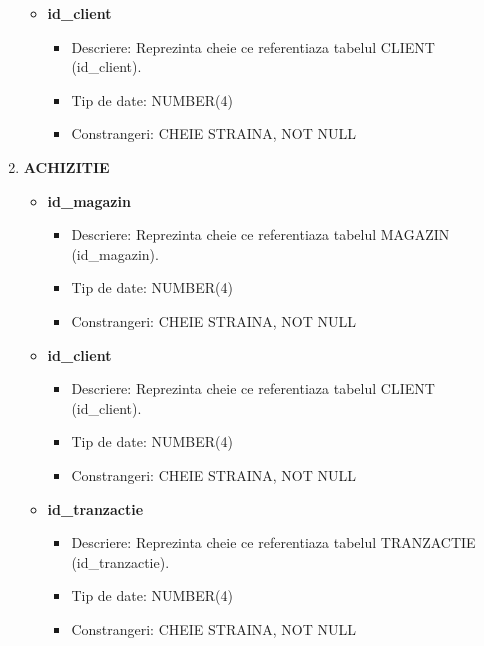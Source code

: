 \begin{enumerate}
\begin{itemize}
        \item \textbf{id\_client}
                \begin{itemize}
                    \item Descriere: Reprezinta cheie ce referentiaza tabelul CLIENT (id\_client).
                    \item Tip de date: NUMBER(4)
                    \item Constrangeri: CHEIE STRAINA, NOT NULL
                \end{itemize}

    \end{itemize}

    \vspace{0.5cm}

    \item \textbf{ACHIZITIE}
    \begin{itemize}
    
       \item \textbf{id\_magazin}
                \begin{itemize}
                    \item Descriere: Reprezinta cheie ce referentiaza tabelul MAGAZIN (id\_magazin).
                    \item Tip de date: NUMBER(4)
                    \item Constrangeri: CHEIE STRAINA, NOT NULL
                \end{itemize}

        \item \textbf{id\_client}
                \begin{itemize}
                    \item Descriere: Reprezinta cheie ce referentiaza tabelul CLIENT (id\_client).
                    \item Tip de date: NUMBER(4)
                    \item Constrangeri: CHEIE STRAINA, NOT NULL
                \end{itemize}

        \item \textbf{id\_tranzactie}
                \begin{itemize}
                    \item Descriere: Reprezinta cheie ce referentiaza tabelul TRANZACTIE (id\_tranzactie).
                    \item Tip de date: NUMBER(4)
                    \item Constrangeri: CHEIE STRAINA, NOT NULL
                \end{itemize}


\end{itemize}
\end{enumerate}
